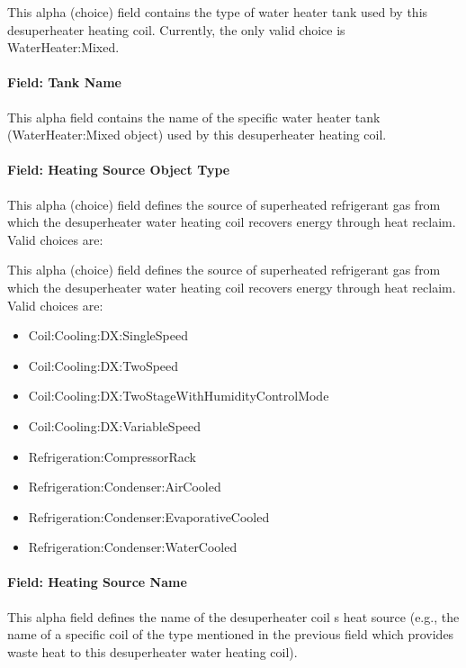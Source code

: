 This alpha (choice) field contains the type of water heater tank used by this desuperheater heating coil. Currently, the only valid choice is WaterHeater:Mixed.

\paragraph{Field: Tank Name}\label{field-tank-name}

This alpha field contains the name of the specific water heater tank (WaterHeater:Mixed object) used by this desuperheater heating coil.

\paragraph{Field: Heating Source Object Type}\label{field-heating-source-object-type-1}

This alpha (choice) field defines the source of superheated refrigerant gas from which the desuperheater water heating coil recovers energy through heat reclaim. Valid choices are:

This alpha (choice) field defines the source of superheated refrigerant gas from which the desuperheater water heating coil recovers energy through heat reclaim. Valid choices are:

\begin{itemize}
\item
  Coil:Cooling:DX:SingleSpeed
\item
  Coil:Cooling:DX:TwoSpeed
\item
  Coil:Cooling:DX:TwoStageWithHumidityControlMode
\item
  Coil:Cooling:DX:VariableSpeed
\item
  Refrigeration:CompressorRack
\item
  Refrigeration:Condenser:AirCooled
\item
  Refrigeration:Condenser:EvaporativeCooled
\item
  Refrigeration:Condenser:WaterCooled
\end{itemize}

\paragraph{Field: Heating Source Name}\label{field-heating-source-name-1}

This alpha field defines the name of the desuperheater coil s heat source (e.g., the name of a specific coil of the type mentioned in the previous field which provides waste heat to this desuperheater water heating coil).


